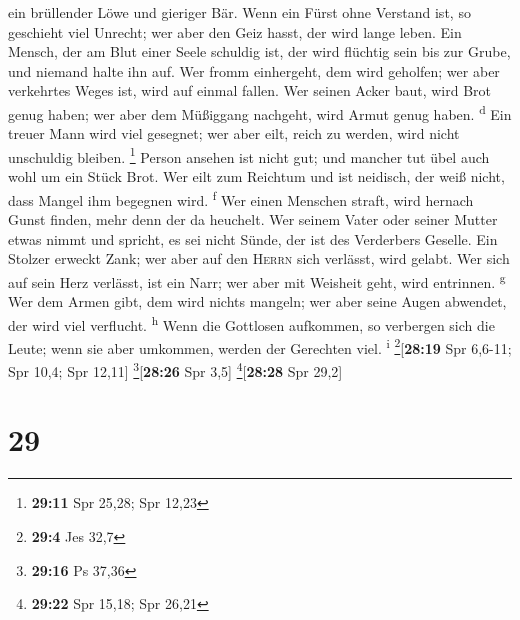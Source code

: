 ein brüllender Löwe und gieriger Bär.  Wenn ein Fürst
ohne Verstand ist, so geschieht viel Unrecht; wer aber den Geiz hasst,
der wird lange leben.  Ein Mensch, der am Blut einer
Seele schuldig ist, der wird flüchtig sein bis zur Grube, und niemand
halte ihn auf.  Wer fromm einhergeht, dem wird geholfen;
wer aber verkehrtes Weges ist, wird auf einmal fallen. 
Wer seinen Acker baut, wird Brot genug haben; wer aber dem Müßiggang
nachgeht, wird Armut genug haben. \textsuperscript{d} 
Ein treuer Mann wird viel gesegnet; wer aber eilt, reich zu werden, wird
nicht unschuldig bleiben. \footnote{\textbf{29:11} Spr 25,28; Spr 12,23}
 Person ansehen ist nicht gut; und mancher tut übel auch
wohl um ein Stück Brot.  Wer eilt zum Reichtum und ist
neidisch, der weiß nicht, dass Mangel ihm begegnen wird.
\textsuperscript{f}  Wer einen Menschen straft, wird
hernach Gunst finden, mehr denn der da heuchelt.  Wer
seinem Vater oder seiner Mutter etwas nimmt und spricht, es sei nicht
Sünde, der ist des Verderbers Geselle.  Ein Stolzer
erweckt Zank; wer aber auf den \textsc{Herrn} sich verlässt, wird
gelabt.  Wer sich auf sein Herz verlässt, ist ein Narr;
wer aber mit Weisheit geht, wird entrinnen. \textsuperscript{g}
 Wer dem Armen gibt, dem wird nichts mangeln; wer aber
seine Augen abwendet, der wird viel verflucht. \textsuperscript{h}
 Wenn die Gottlosen aufkommen, so verbergen sich die
Leute; wenn sie aber umkommen, werden der Gerechten viel.
\textsuperscript{i} \footnote{\textbf{29:4} Jes 32,7}{[}\textbf{28:19}
Spr 6,6-11; Spr 10,4; Spr 12,11{]} \footnote{\textbf{29:16} Ps 37,36}{[}\textbf{28:26}
Spr 3,5{]} \footnote{\textbf{29:22} Spr 15,18; Spr 26,21}{[}\textbf{28:28}
Spr 29,2{]}

\hypertarget{section-28}{%
\section{29}\label{section-28}}

